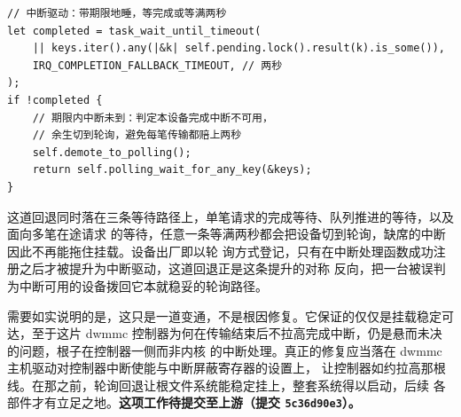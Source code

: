 \begin{lstlisting}[caption={完成等待的超时回退（节选自 \texttt{block\_runtime}）},captionpos=b]
// 中断驱动：带期限地睡，等完成或等满两秒
let completed = task_wait_until_timeout(
    || keys.iter().any(|&k| self.pending.lock().result(k).is_some()),
    IRQ_COMPLETION_FALLBACK_TIMEOUT, // 两秒
);
if !completed {
    // 期限内中断未到：判定本设备完成中断不可用，
    // 余生切到轮询，避免每笔传输都赔上两秒
    self.demote_to_polling();
    return self.polling_wait_for_any_key(&keys);
}
\end{lstlisting}

这道回退同时落在三条等待路径上，单笔请求的完成等待、队列推进的等待，以及面向多笔在途请求
的等待，任意一条等满两秒都会把设备切到轮询，缺席的中断因此不再能拖住挂载。设备出厂即以轮
询方式登记，只有在中断处理函数成功注册之后才被提升为中断驱动，这道回退正是这条提升的对称
反向，把一台被误判为中断可用的设备拨回它本就稳妥的轮询路径。

需要如实说明的是，这只是一道变通，不是根因修复。它保证的仅仅是挂载稳定可达，至于这片
dwmmc 控制器为何在传输结束后不拉高完成中断，仍是悬而未决的问题，根子在控制器一侧而非内核
的中断处理。真正的修复应当落在 dwmmc 主机驱动对控制器中断使能与中断屏蔽寄存器的设置上，
让控制器如约拉高那根线。在那之前，轮询回退让根文件系统能稳定挂上，整套系统得以启动，后续
各部件才有立足之地。\textbf{这项工作待提交至上游（提交 \texttt{5c36d90e3}）。}
